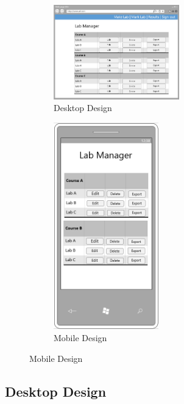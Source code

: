 \documentclass[11pt]{report}
\begin{document}
\begin{figure}[H]
\caption{Lab Manager Page}
\label{fig:manage-page}
\centering
\begin{subfigure}[c]{0.65\textwidth}
    \centering
    \includegraphics[width=0.6\textwidth]{images/design/manager-desktop.png}
    \caption{Desktop Design}
    \label{fig:design-manager-pc}
\end{subfigure}
\hfill
\begin{subfigure}[c]{0.3\textwidth}
    \centering
    \includegraphics[width=0.5\textwidth]{images/design/manager-mobile.png}
    \caption{Mobile Design}
    \label{fig:design-manager-mb}
\end{subfigure}
\end{figure}

\subsection*{Desktop Design}
\end{document}
